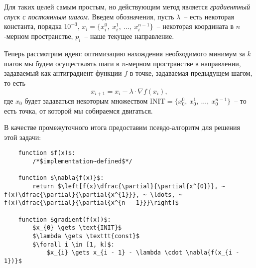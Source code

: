 \documentclass[12pt, a4paper, oneside, final]{article}
\begin{document}
	Для таких целей самым простым, но действующим метод является \textit{градиентный спуск с постоянным шагом}. Введем обозначения, пусть $\lambda$~-- есть некоторая константа, порядка $10^{-3}$, $x_{i} = \{x^{0}_{i}, ~ x^{1}_{i}, ~ \ldots, ~ x^{n - 1}_{i}\}$~-- некоторая координата в $n$-мерном пространстве, $p_{i}$~-- наше текущее направление.

	Теперь рассмотрим идею: оптимизацию нахождения необходимого минимум за $k$ шагов мы будем осуществлять шаги в $n$-мерном пространстве в направлении, задаваемый как антиградиент функции $f$ в точке, задаваемая предыдущем шагом, то есть
	\[
		x_{i + 1} = x_{i} - \lambda \cdot \nabla{f(x_{i})},
	\] где $x_{0}$ будет задаваться некоторым множеством $\text{INIT} = \{x^{0}_{0}, ~ x^{1}_{0}, ~ \ldots, ~ x^{n - 1}_{0}\}$~-- то есть точка, от которой мы собираемся двигаться.

	В качестве промежуточного итога предоставим псевдо-алгоритм для решения этой задачи:
	\begin{lstlisting}
	function $f(x)$:
		/*$implementation~defined$*/

	function $\nabla{f(x)}$:
		return $\left[f(x)\dfrac{\partial}{\partial{x^{0}}}, ~ f(x)\dfrac{\partial}{\partial{x^{1}}}, ~ \ldots, ~ f(x)\dfrac{\partial}{\partial{x^{n - 1}}}\right]$

	function $gradient(f(x))$:
		$x_{0} \gets \text{INIT}$
		$\lambda \gets \texttt{const}$
		$\forall i \in [1, k]$:
		    $x_{i} \gets x_{i - 1} - \lambda \cdot \nabla{f(x_{i - 1})}$
	\end{lstlisting}
\end{document}
